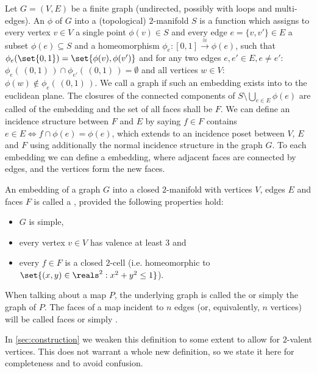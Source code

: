 \begin{definition} Let $G = (V, E)$ be a finite graph (undirected, possibly with loops and multi-edges). An  $\phi$ of $G$ into a (topological) $2$-manifold $S$ is a function which assigns to every vertex $v \in V$ a single point $\phi(v) \in S$ and every edge $e = \{v, v'\} \in E$ a subset $\phi(e) \subseteq S$ and a homeomorphism $\phi_e : [0, 1] \stackrel{\cong}{\longrightarrow} \phi(e)$, such that $\phi_e(\set{0, 1}) = \set{\phi(v), \phi(v')}$ and for any two edges $e, e' \in E, e \neq e'$: $\phi_e(\,(0,1)\,) \cap \phi_{e'}(\,(0,1)\,) = \emptyset$ and all vertices $w \in V$: $\phi(w) \not\in \phi_e(\,(0,1)\,)$. We call a graph  if such an embedding exists into to the euclidean plane. The closures of the connected components of $S \setminus \bigcup_{e \in E} \phi(e)$ are called  of the embedding and the set of all faces shall be $F$. We can define an incidence structure between $F$ and $E$ by saying $f \in F$ contains $e \in E \iff f \cap \phi(e) = \phi(e)$, which extends to an incidence poset between $V$, $E$ and $F$ using additionally the normal incidence structure in the graph $G$. To each embedding we can define a  embedding, where adjacent faces are connected by edges, and the vertices form the new faces.
\end{definition}

\begin{definition} \label{def:map} An embedding of a graph $G$ into a closed $2$-manifold with vertices $V$, edges $E$ and faces $F$ is called a , provided the following properties hold:
  \begin{itemize}
  \item $G$ is simple,
  \item every vertex $v \in V$ has valence at least $3$ and
  \item every $f \in F$ is a closed $2$-cell (i.e. homeomorphic to $\set{(x, y) \in \reals^2 : x^2 + y^2 \leq 1}$).
  \end{itemize}
  When talking about a map $P$, the underlying graph is called the  or simply the graph of $P$. The faces of a map incident to $n$ edges (or, equivalently, $n$ vertices) will be called  faces or simply .
\end{definition}

\begin{remark}
  In \autoref{sec:construction} we weaken this definition to some extent to allow for $2$-valent vertices. This does not warrant a whole new definition, so we state it here for completeness and to avoid confusion.
\end{remark}

